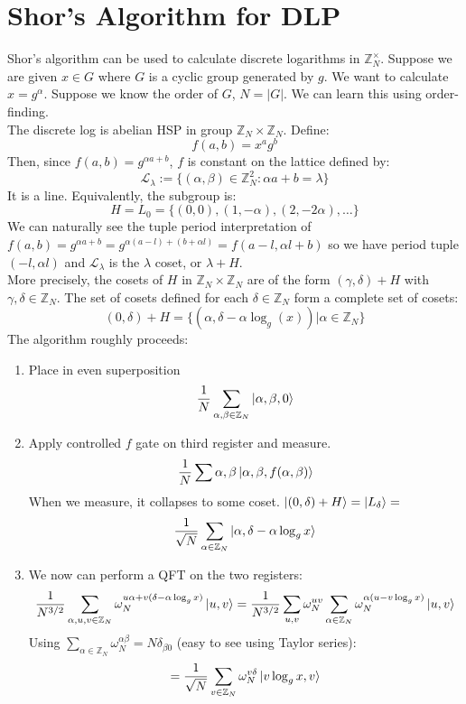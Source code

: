 \documentclass{article}
\begin{document}
\section{Shor's Algorithm for DLP}
Shor's algorithm can be used to calculate discrete logarithms in $\mathbb{Z}_N^\times.$ Suppose we are given $x \in G$ where $G$ is a cyclic group generated by $g$. We want to calculate $x = g^\alpha$. Suppose we know the order of $G$, $N = |G|$. We can learn this using order-finding. \\
The discrete log is abelian HSP in group $\mathbb{Z}_N \times \mathbb{Z}_N$. Define:
$$f(a,b) = x^a g^b$$
Then, since $f(a,b) = g^{\alpha a + b}$, $f$ is constant on the lattice defined by:
$$\mathcal{L}_\lambda := \{(\alpha, \beta) \in \mathbb{Z}_N^2 : \alpha a + b = \lambda\}$$
It is a line. Equivalently, the subgroup is:
$$H = L_0 = \{ (0,0), (1, -\alpha), (2, -2\alpha), \dots\}$$
We can naturally see the tuple period interpretation of $f(a,b) = g^{\alpha a + b} = g^{\alpha(a-l) + (b+\alpha l)} = f(a-l, \alpha l + b)$ so we have period tuple $(-l, \alpha l)$
and $\mathcal{L}_\lambda$ is the $\lambda$ coset, or $\lambda + H$.\\
More precisely, the cosets of $H$ in $\mathbb{Z}_N \times \mathbb{Z}_N$ are of the form $(\gamma, \delta) + H$ with $\gamma, \delta \in \mathbb{Z}_N$. The set of cosets defined for each $\delta \in \mathbb{Z}_N$ form a complete set of cosets:
$$(0, \delta) + H = \{ (\alpha, \delta - \alpha \log_g(x)) | \alpha \in \mathbb{Z}_N \}$$
The algorithm roughly proceeds:
\begin{enumerate}
	\item Place in even superposition $$\frac{1}{N} \sum_{\alpha, \beta \in \mathbb{Z}_N} \ket{\alpha, \beta, 0}$$
	\item Apply controlled $f$ gate on third register and measure.
	$$\frac{1}{N} \sum{\alpha, \beta}\ket{\alpha, \beta, f(\alpha, \beta)}$$
	When we measure, it collapses to some coset. $\ket{(0,\delta) + H} = \ket{L_\delta} = $
	$$\frac{1}{\sqrt{N}} \sum_{\alpha \in \mathbb{Z}_N} \ket{\alpha, \delta-\alpha \log_g x}$$
\item We now can perform a QFT on the two registers:
	$$\frac{1}{N^{3/2}} \sum_{\alpha, u, v \in \mathbb{Z}_N} \omega_N^{u\alpha + v(\delta - \alpha \log_g x)} \ket{u,v}= \frac{1}{N^{3/2}} \sum_{u,v} \omega_N^{uv} \sum_{\alpha \in \mathbb{Z}_N} \omega_N^{\alpha(u-v \log_g x)} \ket{u,v}$$
	Using $\sum_{\alpha \in \mathbb{Z}_N} \omega^{\alpha \beta}_N = N \delta_{\beta 0}$ (easy to see using Taylor series):
	$$ = \frac{1}{\sqrt{N}} \sum_{v \in \mathbb{Z}_N} \omega^{v \delta}_N \ket{v \log_g x, v}$$
\end{enumerate}
\end{document}
